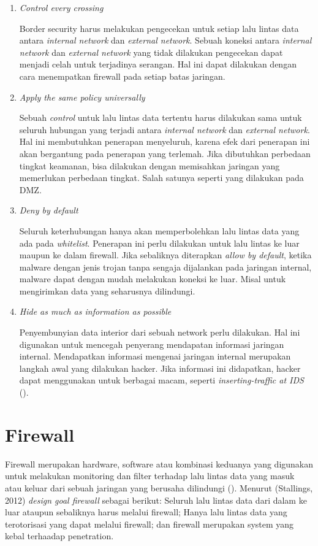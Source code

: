 \begin{enumerate}
	\item \textit{Control every crossing}
	
	Border security harus melakukan pengecekan untuk setiap lalu lintas data antara \textit{internal network} dan \textit{external network}. Sebuah koneksi antara \textit{internal network} dan \textit{external network} yang tidak dilakukan pengecekan
	dapat menjadi celah untuk terjadinya serangan. Hal ini dapat dilakukan dengan cara menempatkan firewall pada setiap batas jaringan.
	
	\item \textit{Apply the same policy universally}
	
	Sebuah \textit{control} untuk lalu lintas data tertentu harus dilakukan sama untuk seluruh hubungan yang terjadi antara \textit{internal network} dan \textit{external network}. Hal ini membutuhkan penerapan menyeluruh, karena efek dari penerapan ini akan bergantung pada penerapan yang terlemah. Jika dibutuhkan perbedaan tingkat keamanan, bisa dilakukan dengan memisahkan jaringan yang memerlukan perbedaan tingkat. Salah satunya seperti yang dilakukan pada DMZ.
	
	\item \textit{Deny by default}
	
	Seluruh keterhubungan hanya akan memperbolehkan lalu lintas data yang ada pada \textit{whitelist}. Penerapan ini perlu dilakukan untuk lalu lintas ke luar	maupun ke dalam firewall. Jika sebaliknya diterapkan \textit{allow by default}, ketika malware dengan jenis trojan tanpa sengaja dijalankan pada jaringan internal, malware dapat dengan mudah melakukan koneksi ke luar. Misal untuk mengirimkan data yang seharusnya dilindungi.
	
	\item \textit{Hide as much as information as possible}
	
	Penyembunyian data interior dari sebuah network perlu dilakukan. Hal ini digunakan untuk mencegah penyerang mendapatan informasi jaringan internal. Mendapatkan informasi mengenai jaringan internal merupakan langkah awal yang dilakukan hacker. Jika informasi ini didapatkan, hacker dapat menggunakan untuk berbagai macam, seperti \textit{inserting-traffic at IDS} (\cite{marpaung2012survey}).
	
\end{enumerate}

\section{Firewall}
Firewall merupakan hardware, software atau kombinasi keduanya yang digunakan untuk melakukan monitoring dan filter terhadap lalu lintas data yang masuk atau keluar dari sebuah jaringan yang berusaha dilindungi (\cite{kizza2002computer}). Menurut (Stallings, 2012) \textit{design goal firewall} sebagai berikut: 
Seluruh lalu lintas data dari dalam ke luar ataupun sebaliknya harus melalui firewall;
Hanya lalu lintas data yang terotorisasi yang dapat melalui firewall;
dan firewall merupakan system yang kebal terhaadap penetration.

